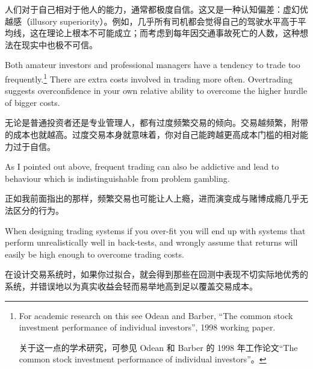 \begin{chineseblock}人们对于自己相对于他人的能力，通常都极度自信。这又是一种认知偏差：虚幻优越感（illusory superiority）。例如，几乎所有司机都会觉得自己的驾驶水平高于平均线，这在理论上根本不可能成立；而考虑到每年因交通事故死亡的人数，这种想法在现实中也极不可信。\end{chineseblock}

\bipairgap

\begin{englishblock} Both amateur investors and professional managers have a tendency to trade too frequently.\footnote{For academic research on this see Odean and Barber, ``The common stock investment performance of individual investors'', 1998 working paper. \par 关于这一点的学术研究，可参见 Odean 和 Barber 的 1998 年工作论文“The common stock investment performance of individual investors”。} There are extra costs involved in trading more often. Overtrading suggests overconfidence in your own relative ability to overcome the higher hurdle of bigger costs. \end{englishblock}

\begin{chineseblock}无论是普通投资者还是专业管理人，都有过度频繁交易的倾向。交易越频繁，附带的成本也就越高。过度交易本身就意味着，你对自己能跨越更高成本门槛的相对能力过于自信。\end{chineseblock}

\bipairgap

\begin{englishblock} As I pointed out above, frequent trading can also be addictive and lead to behaviour which is indistinguishable from problem gambling. \end{englishblock}

\begin{chineseblock}正如我前面指出的那样，频繁交易也可能让人上瘾，进而演变成与赌博成瘾几乎无法区分的行为。\end{chineseblock}

\bipairgap

\begin{englishblock} When designing trading systems if you over-fit you will end up with systems that perform unrealistically well in back-tests, and wrongly assume that returns will easily be high enough to overcome trading costs. \end{englishblock}

\begin{chineseblock}在设计交易系统时，如果你过拟合，就会得到那些在回测中表现不切实际地优秀的系统，并错误地以为真实收益会轻而易举地高到足以覆盖交易成本。\end{chineseblock}

